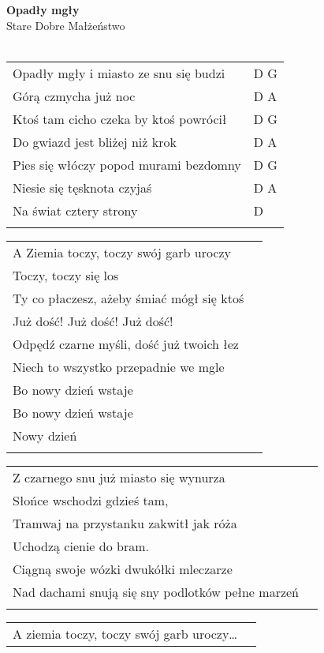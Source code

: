 \documentclass[a5paper]{article}
\begin{document}


\noindent
\fontsize{12pt}{15pt}\selectfont
\textbf{Opadły mgły} \\
\fontsize{8pt}{10pt}\selectfont
Stare Dobre Małżeństwo \\ \\
\fontsize{10pt}{12pt}\selectfont
{}
\begin{tabular}{@{}p{8.50cm}p{3cm}@{}}
\noindent
Opadły mgły i miasto ze snu się budzi & D G \\
Górą czmycha już noc & D A \\
Ktoś tam cicho czeka by ktoś powrócił & D G \\
Do gwiazd jest bliżej niż krok & D A\\
Pies się włóczy popod murami bezdomny & D G \\
Niesie się tęsknota czyjaś & D A \\
Na świat cztery strony & D \\ \\
\end{tabular} 

\noindent
\begin{tabular}{@{}p{7.50cm}p{3cm}@{}}
A Ziemia toczy, toczy swój garb uroczy \\
Toczy, toczy się los \\
Ty co płaczesz, ażeby śmiać mógł się ktoś \\
Już dość! Już dość! Już dość! \\
Odpędź czarne myśli, dość już twoich łez \\
Niech to wszystko przepadnie we mgle \\
Bo nowy dzień wstaje \\
Bo nowy dzień wstaje \\
Nowy dzień \\ \\
\end{tabular} 

\noindent
\begin{tabular}{@{}p{7.50cm}p{3cm}@{}}
Z czarnego snu już miasto się wynurza \\
Słońce wschodzi gdzieś tam, \\
Tramwaj na przystanku zakwitł jak róża \\
Uchodzą cienie do bram. \\
Ciągną swoje wózki dwukółki mleczarze  \\
Nad dachami snują się sny podlotków pełne marzeń \\ \\
\end{tabular} 

\noindent
\begin{tabular}{@{}p{7.50cm}p{3cm}@{}}
A ziemia toczy, toczy swój garb uroczy…
\end{tabular} 
\end{document}
